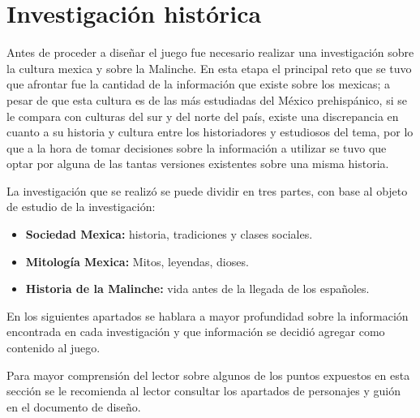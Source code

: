 \section{Investigación histórica}
	Antes de proceder a diseñar el juego fue necesario realizar una investigación 
	sobre la cultura mexica y sobre la Malinche. En esta etapa el principal reto 
	que se tuvo que afrontar fue la cantidad de la información que existe sobre 
	los mexicas; a pesar de que esta cultura es de las más estudiadas del México 
	prehispánico, si se le compara con culturas del sur y del norte del país, existe 
	una discrepancia en cuanto a su historia y cultura entre los historiadores y 
	estudiosos del tema, por lo que a la hora de tomar decisiones sobre la información 
	a utilizar se tuvo que optar por alguna de las tantas versiones existentes sobre 
	una misma historia.
	\\
	\par
	La investigación que se realizó se puede dividir en tres partes, con base al 
	objeto de estudio de la investigación:
	\begin{itemize}
		\item \textbf{Sociedad Mexica:} historia, tradiciones y clases sociales.
		\item \textbf{Mitología Mexica:} Mitos, leyendas, dioses.
		\item \textbf{Historia de la Malinche:} vida antes de la llegada de los 
		españoles.
	\end{itemize}
	
	En los siguientes apartados se hablara a mayor profundidad sobre la información 
	encontrada en cada investigación y que información se decidió agregar como 
	contenido al juego.
	\\
	\par
	Para mayor comprensión del lector sobre algunos de los puntos expuestos en esta 
	sección se le recomienda al lector consultar los apartados de personajes y 
	guión en el documento de diseño.
	
